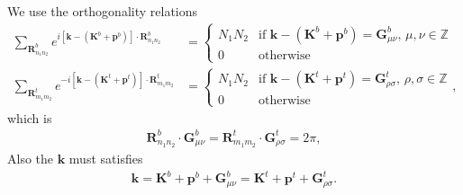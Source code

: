 \documentclass[10pt, oneside]{article}
\newcommand{\p}[1]{\left(#1\right)}
\newcommand{\bb}[1]{\left[#1\right]}
\begin{document}
We use the orthogonality relations
\begin{align}
	\sum_{\bm{R}^{b}_{n_1 n_2}}e^{ i \bb{\bm{k} - \p{\bm{K}^{b} + \bm{p}^{b}}} \cdot \bm{R}^{b}_{n_1 n_2}} &= 
	\begin{cases} 
	N_1 N_2 & \text{if } \bm{k} - \p{\bm{K}^{b} + \bm{p}^{b}} = \bm{G}^{b}_{\mu \nu} ,\, \mu, \nu \in \mathbb{Z}\\
	0 & \text{otherwise} 
	\end{cases} \\
	\sum_{\bm{R}^{t}_{m_1 m_2}} e^{  - i \bb{\bm{k} - \p{\bm{K}^{t} + \bm{p}^{t}}} \cdot \bm{R}^{t}_{m_1 m_2}} &=
	 \begin{cases}
		N_1 N_2  & \text{if } \bm{k} - \p{\bm{K}^{t} + \bm{p}^{t}} = \bm{G}^{t}_{\rho \sigma}, \, \rho,\sigma \in \mathbb{Z}\\
		0 & \text{otherwise} 
	\end{cases},
\end{align}
which is 
\begin{align}
	\bm{R}^{b}_{n_1 n_2} \cdot \bm{G}^{b}_{\mu \nu} =  \bm{R}^{t}_{m_1 m_2} \cdot  \bm{G}^{t}_{\rho \sigma} = 2 \pi,
\end{align}
Also the $\bm{k}$ must satisfies 
\begin{align}
	\bm{k} = \bm{K}^b + \bm{p}^b + \bm{G}^{b}_{\mu \nu} = \bm{K}^{t} + \bm{p}^{t}+ \bm{G}^{t}_{\rho \sigma}.
\end{align}
\end{document}
